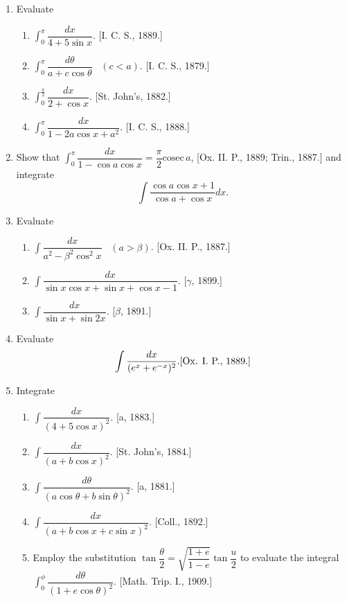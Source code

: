 \documentclass[11pt, a4paper]{article}
\newcommand{\source}[1]{\hfill\textnormal{[#1]}}
\begin{document}
\begin{enumerate}[leftmargin=2em]
\item Evaluate
\begin{enumerate}[label=(\roman*)]
\item $\displaystyle\int_0^\pi \dfrac{dx}{4+5\sin x}$. \source{I. C. S., 1889.}
\item $\displaystyle\int_0^\pi \dfrac{d\theta}{a+c\cos\theta}$ \ $(c<a)$. \source{I. C. S., 1879.}
\item $\displaystyle\int_0^{\frac\pi2} \dfrac{dx}{2+\cos x}$. \source{St. John's, 1882.}
\item $\displaystyle\int_0^\pi \dfrac{dx}{1-2a\cos x+a^2}$. \source{I. C. S., 1888.}
\end{enumerate}

\item Show that $\displaystyle\int_0^\pi \dfrac{dx}{1-\cos a\cos x} = \dfrac{\pi}{2}\text{cosec}\,a$, \source{Ox. II. P., 1889; Trin., 1887.}
and integrate
\[
\int \dfrac{\cos a\cos x+1}{\cos a+\cos x}dx.
\]

\item Evaluate
\begin{enumerate}[label=(\roman*)]
\item $\displaystyle\int \dfrac{dx}{a^2-\beta^2\cos^2x}$ \ $(a>\beta)$. \source{Ox. II. P., 1887.}
\item $\displaystyle\int \dfrac{dx}{\sin x\cos x+\sin x+\cos x-1}$. \source{$\gamma$, 1899.}
\item $\displaystyle\int \dfrac{dx}{\sin x+\sin 2x}$. \source{$\beta$, 1891.}
\end{enumerate}

\item Evaluate
\[
\int \dfrac{dx}{(e^x+e^{-x})^2}. \source{Ox. I. P., 1889.}
\]

\item Integrate
\begin{enumerate}[label=(\roman*)]
\item $\displaystyle\int \dfrac{dx}{(4+5\cos x)^2}$. \source{a, 1883.}
\item $\displaystyle\int \dfrac{dx}{(a+b\cos x)^2}$. \source{St. John's, 1884.}
\item $\displaystyle\int \dfrac{d\theta}{(a\cos\theta+b\sin\theta)^2}$. \source{a, 1881.}
\item $\displaystyle\int \dfrac{dx}{(a+b\cos x+c\sin x)^2}$. \source{Coll., 1892.}
\item Employ the substitution $\tan\dfrac\theta2=\sqrt{\dfrac{1+e}{1-e}}\tan\dfrac u2$ to evaluate the integral $\displaystyle\int_0^\phi \dfrac{d\theta}{(1+e\cos\theta)^2}$. \source{Math. Trip. I., 1909.}
\end{enumerate}


\end{enumerate}
\end{document}

